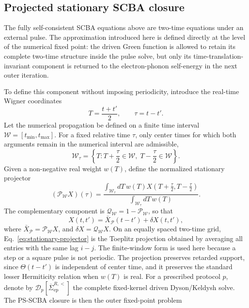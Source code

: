 \documentclass[
 reprint,
 superscriptaddress,
 amsmath,amssymb,
 aps,prb,
 longbibliography,
 floatfix
]{revtex4-2}
\newcommand{\ep}{\mathrm{ep}}
\newcommand{\barSigma}{\overline{\Sigma}}
\newcommand{\proj}{\mathcal P}
\newcommand{\qproj}{\mathcal Q}
\begin{document}
\subsection{Projected stationary SCBA closure}
\label{subsec:projected-scba}

The fully self-consistent SCBA equations above are two-time equations under an external pulse. The approximation introduced here is defined directly at the level of the numerical fixed point: the driven Green function is allowed to retain its complete two-time structure inside the pulse solve, but only its time-translation-invariant component is returned to the electron-phonon self-energy in the next outer iteration.

To define this component without imposing periodicity, introduce the real-time Wigner coordinates
\begin{equation*}
T=\frac{t+t'}{2},
\qquad
\tau=t-t'.
\end{equation*}
Let the numerical propagation be defined on a finite time interval
\(\mathcal W=[t_{\min},t_{\max}]\). For a fixed relative time \(\tau\), only center times for which both arguments remain in the numerical interval are admissible,
\begin{equation*}
\mathcal W_\tau
=
\left\{
T:
T+\frac{\tau}{2}\in\mathcal W,\;
T-\frac{\tau}{2}\in\mathcal W
\right\}.
\end{equation*}
Given a non-negative real weight \(w(T)\), define the normalized stationary projector
\begin{equation}
(\proj_{\mathcal W}X)(\tau)
=
\frac{
\displaystyle
\int_{\mathcal W_\tau} dT\,
w(T)
X\!\left(
T+\frac{\tau}{2},
T-\frac{\tau}{2}
\right)
}{
\displaystyle
\int_{\mathcal W_\tau} dT\,w(T)
}.
\label{eq:stationary-projector}
\end{equation}
The complementary component is
\(\qproj_{\mathcal W}=1-\proj_{\mathcal W}\), so that
\begin{equation*}
X(t,t')
=
\bar X_{\mathcal P}(t-t')
+
\delta X(t,t'),
\end{equation*}
where $\bar X_{\mathcal P}=\proj_{\mathcal W}X$, and $\delta X=\qproj_{\mathcal W}X$. On an equally spaced two-time grid, Eq.~\eqref{eq:stationary-projector} is the Toeplitz projection obtained by averaging all entries with the same lag \(i-j\). The finite-window form is used here because a step or a square pulse is not periodic. The projection preserves retarded support, since \(\Theta(t-t')\) is independent of center time, and it preserves the standard lesser Hermiticity relation when \(w(T)\) is real. For a prescribed protocol \(p\), denote by $\mathcal D_p\!\left[\barSigma_{\ep}^{R,<}\right]$ the complete fixed-kernel driven Dyson/Keldysh solve. The PS-SCBA closure is then the outer fixed-point problem
\end{document}
